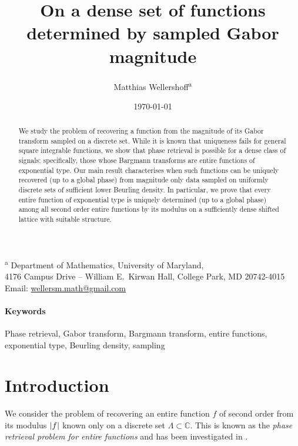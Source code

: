 \documentclass{article}
\title{On a dense set of functions determined by sampled Gabor magnitude}
\author{Matthias Wellershoff\textsuperscript{a}}
\date{\today}
\newcommand{\bbC}{\mathbb{C}}
\DeclarePairedDelimiter{\abs}{\lvert}{\rvert}
\theoremstyle{remark}
\begin{document}
    \maketitle

    \vspace{-15pt}
    \begin{center}
        \textsuperscript{a} Department of Mathematics, University of Maryland, \\
        4176 Campus Drive -- William E.~Kirwan Hall, College Park, MD 20742-4015 \\
        Email: \href{mailto:wellersm.math@gmail.com}{wellersm.math@gmail.com}
    \end{center}
    \vspace{10pt}

    \begin{abstract}
        We study the problem of recovering a function from the magnitude of its Gabor transform sampled on a discrete set. While it is known that uniqueness fails for general square integrable functions, we show that phase retrieval is possible for a dense class of signals: specifically, those whose Bargmann transforms are entire functions of exponential type. Our main result characterises when such functions can be uniquely recovered (up to a global phase) from magnitude only data sampled on uniformly discrete sets of sufficient lower Beurling density. In particular, we prove that every entire function of exponential type is uniquely determined (up to a global phase) among all second order entire functions by its modulus on a sufficiently dense shifted lattice with suitable structure.
    \end{abstract}

    \paragraph{Keywords} Phase retrieval, Gabor transform, Bargmann transform, entire functions, exponential type, Beurling density, sampling

    \section{Introduction}

    We consider the problem of recovering an entire function $f$ of second order from its modulus $\abs{f}$ known only on a discrete set $\Lambda \subset \bbC$. This is known as the \emph{phase retrieval problem for entire functions} and has been investigated in \cite{Liehr2024Arithmetic,McDonald2004Phase,Wellershoff2024Phase}. 
\end{document}
